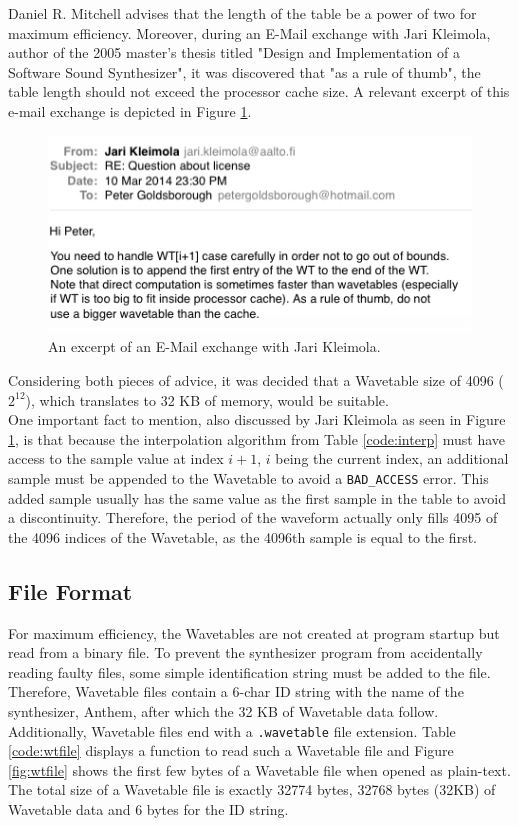   \noindent Daniel R. Mitchell advises that the length of the table be a power of two for maximum efficiency.  Moreover, during an E-Mail exchange with Jari Kleimola, author of the 2005 master's thesis titled "Design and Implementation of a Software Sound Synthesizer", it was discovered that "as a rule of thumb", the table length should not exceed the processor cache size. A relevant excerpt of this e-mail exchange is depicted in Figure \ref{fig:jari}.

  \begin{figure}
    \includegraphics[scale=0.7]{img/jari}
    \caption{An excerpt of an E-Mail exchange with Jari Kleimola.}
    \label{fig:jari}
  \end{figure}

  \noindent Considering both pieces of advice, it was decided that a Wavetable size of 4096 ($2^12$), which translates to 32 KB of memory, would be suitable.\\

  \noindent One important fact to mention, also discussed by Jari Kleimola as seen in Figure \ref{fig:jari}, is that because the interpolation algorithm from Table \ref{code:interp} must have access to the sample value at index $i+1$, $i$ being the current index, an additional sample must be appended to the Wavetable to avoid a \texttt{BAD\_ACCESS} error. This added sample usually has the same value as the first sample in the table to avoid a discontinuity. Therefore, the period of the waveform actually only fills 4095 of the 4096 indices of the Wavetable, as the 4096th sample is equal to the first.

  \subsection{File Format}

  For maximum efficiency, the Wavetables are not created at program startup but read from a binary file. To prevent the synthesizer program from accidentally reading faulty files, some simple identification string must be added to the file. Therefore, Wavetable files contain a 6-char ID string with the name of the synthesizer, Anthem, after which the 32 KB of Wavetable data follow. Additionally, Wavetable files end with a \texttt{.wavetable} file extension. Table \ref{code:wtfile} displays a function to read such a Wavetable file and Figure \ref{fig:wtfile} shows the first few bytes of a Wavetable file when opened as plain-text. The total size of a Wavetable file is exactly 32774 bytes, 32768 bytes (32KB) of Wavetable data and 6 bytes for the ID string.

